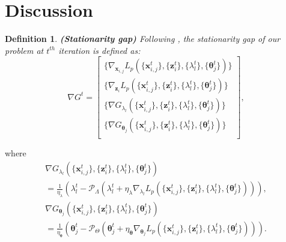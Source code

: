 \documentclass[letterpaper]{article} %
\newtheorem{definition}{Definition}
\begin{document}
\section{Discussion}
\begin{definition}
\label{definition:1}
{\textbf{(Stationarity gap)}} Following \cite{xu2020unified,lu2020hybrid,jiao2022distributed}, the \textit{stationarity} \textit{gap} of our problem at $t^{{th}}$ iteration is defined as:
\begin{equation}
\label{eq:definition1}
\nabla G^t = \left[ \begin{array}{l}
\{ {\nabla _{\boldsymbol{x}_{i,j}}}L_p(\{{\boldsymbol{x}_{i,j}^t}\} ,\!\{{\boldsymbol{z}_i^t} \},\! \{\lambda_l^t\}, \!\{\boldsymbol{\theta}_j^t\} )\}\\

\{ {\nabla _{\boldsymbol{z}_i}}L_p(\{{\boldsymbol{x}_{i,j}^t}\} ,\!\{{\boldsymbol{z}_i^t} \},\! \{\lambda_l^t\}, \!\{\boldsymbol{\theta}_j^t\} ) \} \\

\{  {\nabla G_{{\lambda_l}}}(\{{\boldsymbol{x}_{i,j}^t}\} ,\!\{{\boldsymbol{z}_i^t} \},\! \{\lambda_l^t\}, \!\{\boldsymbol{\theta}_j^t\} )   \} \\
\{{\nabla G_{{\boldsymbol{\theta}_j}}}(\{{\boldsymbol{x}_{i,j}^t}\} ,\!\{{\boldsymbol{z}_i^t} \},\! \{\lambda_l^t\}, \!\{\boldsymbol{\theta}_j^t\} )\} \\
\end{array} \right],
\end{equation}
\end{definition}
where
\begin{equation}
\begin{array}{l}
{\nabla G_{{\lambda_l}}}(\{{\boldsymbol{x}_{i,j}^t}\},\!\{{\boldsymbol{z}_i^t} \},\! \{\lambda_l^t\}, \!\{\boldsymbol{\theta}_j^t\} )

\\ \!= \! \frac{1}{\eta_{\lambda}}\left(\lambda_l^t \!-\!\mathcal{P}_{\Lambda} (\lambda_l^t \!+\! \eta_{\lambda}{\nabla _{\lambda_l}}L_p(\{{\boldsymbol{x}_{i,j}^t}\} ,\!\{{\boldsymbol{z}_i^t} \},\! \{\lambda_l^t\}, \!\{\boldsymbol{\theta}_j^t\} ))\right) , \\%

{\nabla G_{{\boldsymbol{\theta}_j}}}(\{{\boldsymbol{x}_{i,j}^t}\},\!\{{\boldsymbol{z}_i^t} \},\! \{\lambda_l^t\}, \!\{\boldsymbol{\theta}_j^t\} )

\\ \! = \! \frac{1}{\eta_{\boldsymbol{\theta}}}\left(\boldsymbol{\theta}_j^t \!- \! \mathcal{P}_{\Theta} (\boldsymbol{\theta}_j^t \!+\! \eta_{\boldsymbol{\theta}}{\nabla _{\boldsymbol{\theta}_j}}L_p(\{{\boldsymbol{x}_{i,j}^t}\} ,\!\{{\boldsymbol{z}_i^t} \},\! \{\lambda_l^t\}, \!\{\boldsymbol{\theta}_j^t\} ))\right) .
\end{array}
\end{equation}
\end{document}
